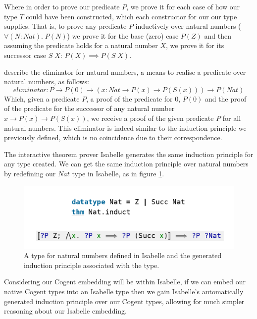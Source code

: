Where in order to prove our predicate $P$, we prove it for each case of how our type $T$ could have been
constructed, which each constructor for our our type supplies.
That is, to prove any predicate $P$ inductively over natural numbers ($\forall(N : Nat).\; P(N)$)
we prove it for the base (zero) case $P(Z)$ and then assuming the predicate holds
for a natural number $X$, we prove it for its successor case $S\; X$: $P(X) \implies P(S\; X)$.

\citet{CoquandTypes} describe the eliminator for natural numbers, a means to realise a predicate over
natural numbers, as follows:
\[
    eliminator : P \rightarrow P (0) \rightarrow (x : Nat \rightarrow P (x) \rightarrow P(S(x))) \rightarrow P(Nat)    
\]
Which, given a predicate $P$, a proof of the predicate for $0$, $P(0)$ and the proof of the predicate
for the successor of any natural number $x  \rightarrow P (x) \rightarrow P(S(x))$, we receive a proof
of the given predicate $P$ for all natural numbers. This eliminator is indeed similar to the induction
principle we previously defined, which is no coincidence due to their correspondence.

The interactive theorem prover Isabelle generates the same induction principle for any type created.
We can get the same induction principle over natural numbers by redefining our $Nat$
type in Isabelle, as in figure \ref{fig:IsabelleNatInduct}.

\begin{center}
    \begin{figure}
        \includegraphics[width=\linewidth]{content/isabelleNatInduct.png}
        \caption{A type for natural numbers defined in Isabelle and the generated 
        induction principle associated with the type.}
        \label{fig:IsabelleNatInduct}
    \end{figure}
\end{center}

\FloatBarrier

Considering our Cogent embedding will be within Isabelle, if we can embed our native
Cogent types into an Isabelle type then we gain Isabelle's automatically generated
induction principle over our Cogent types, allowing for much 
simpler reasoning about our Isabelle embedding.

